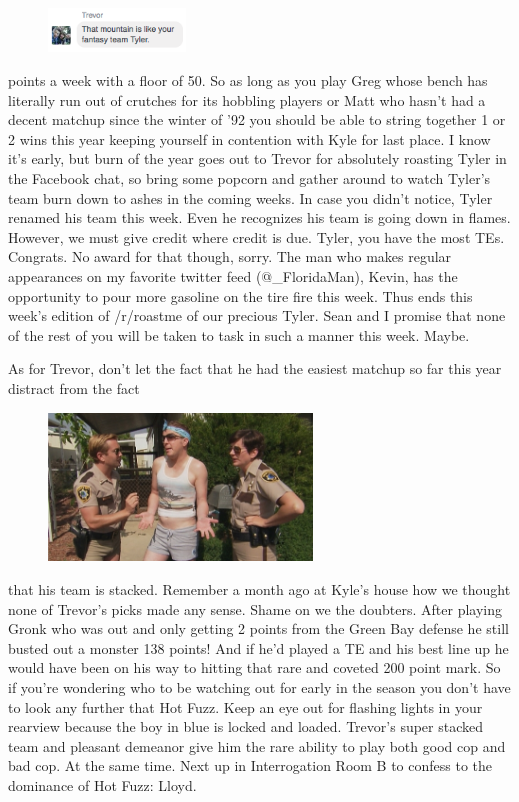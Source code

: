 \documentclass[11pt,letterpaper]{article}
\begin{document}
\begin{figure}
\centering
\includegraphics[width=0.325\textwidth]{week3-trevor.png}
\label{fig:week3-trevor}
\end{figure} 
\par{} points a week with a floor of 50. So as long as you play Greg whose bench has literally run out of crutches for its hobbling players or Matt who hasn't had a decent matchup since the winter of '92 you should be able to string together 1 or 2 wins this year keeping yourself in contention with Kyle for last place. I know it's early, but burn of the year goes out to Trevor for absolutely roasting Tyler in the Facebook chat, so bring some popcorn and gather around to watch Tyler's team burn down to ashes in the coming weeks. In case you didn't notice, Tyler renamed his team this week. Even he recognizes his team is going down in flames. However, we must give credit where credit is due. Tyler, you have the most TEs. Congrats. No award for that though, sorry. The man who makes regular appearances on my favorite twitter feed (@\_FloridaMan), Kevin, has the opportunity to pour more gasoline on the tire fire this week. Thus ends this week's edition of /r/roastme of our precious Tyler. Sean and I promise that none of the rest of you will be taken to task in such a manner this week. Maybe.
\bigskip
\par\noindent  As for Trevor, don't let the fact that he had the easiest matchup so far this year distract from the fact
\begin{figure}
\centering
\includegraphics[width=0.625\textwidth]{week3-terry.png}
\label{fig:week3-terry}
\end{figure} 
\par{} that his team is stacked. Remember a month ago at Kyle's house how we thought none of Trevor's picks made any sense. Shame on we the doubters. After playing Gronk who was out and only getting 2 points from the Green Bay defense he still busted out a monster 138 points! And if he'd played a TE and his best line up he would have been on his way to hitting that rare and coveted 200 point mark. So if you're wondering who to be watching out for early in the season you don't have to look any further that Hot Fuzz. Keep an eye out for flashing lights in your rearview because the boy in blue is locked and loaded. Trevor's super stacked team and pleasant demeanor give him the rare ability to play both good cop and bad cop. At the same time. Next up in Interrogation Room B to confess to the dominance of Hot Fuzz: Lloyd.
\end{document}
